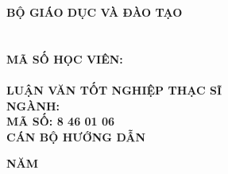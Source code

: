 \begin{titlepage}


\begin{center}

{\fontsize{14}{0pt}\selectfont\bfseries BỘ GIÁO DỤC VÀ ĐÀO TẠO}\\
\textbf{\fontsize{14}{0pt}\selectfont\university}
\\[2cm]

\textbf{\fontsize{14}{0pt}\selectfont\MakeUppercase\student}\\
\textbf{\fontsize{14}{0pt}\selectfont MÃ SỐ HỌC VIÊN: \MakeUppercase\studentid}
\\[3cm]

\textbf{{\fontsize{20}{0pt}\selectfont\MakeUppercase \nametitle}}
\\[3cm]

\textbf{\fontsize{16}{0pt}\selectfont LUẬN VĂN TỐT NGHIỆP THẠC SĨ}\\[1em]

\textbf{\fontsize{14}{0pt}\selectfont NGÀNH: \MakeUppercase \major}\\[1em]
\textbf{\fontsize{14}{0pt}\selectfont MÃ SỐ: 8 46 01 06}
\\[2cm]

\textbf{\fontsize{13}{0pt}\selectfont CÁN BỘ HƯỚNG DẪN\\\fontsize{13}{0pt}\selectfont \MakeUppercase \MainAdvisor}

\vfill
\textbf{\fontsize{14}{0pt}\selectfont NĂM \yeardone}

\end{center}


\end{titlepage}